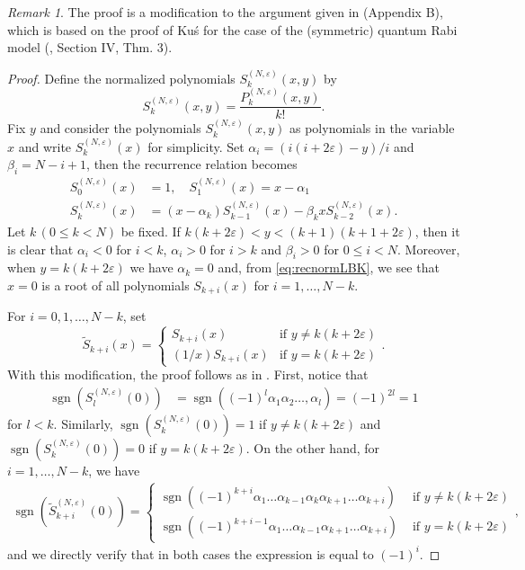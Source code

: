 \documentclass[11pt]{article}
\numberwithin{equation}{section}
\newcommand{\e}{\varepsilon}
\newcommand{\cp}[2]{P^{(#1)}_{#2}} %
\DeclareMathOperator{\sgn}{sgn}
\theoremstyle{plain}
\theoremstyle{definition}
\theoremstyle{remark}
\newtheorem{rem}{Remark}[section]
\begin{document}
\begin{rem}
  The proof is a modification to the argument given in \cite{LB2016JPA} (Appendix B), which is based on the proof of  Ku\'s for the case of
  the (symmetric) quantum Rabi model (\cite{K1985JMP}, Section IV, Thm. 3).
\end{rem}

\begin{proof}
  Define the normalized polynomials \(S_k^{(N,\e)}(x,y)\) by
  \[
    S_k^{(N,\e)}(x,y) = \frac{\cp{N,\e}{k}(x,y)}{k!}.
  \]
  Fix \(y\) and consider the polynomials \(S_k^{(N,\e)}(x,y)\) as polynomials in the variable \(x\) and write \(S_k^{(N,\e)}(x)\) for
  simplicity. Set \(\alpha_i = (i(i + 2\e) - y)/i\) and \(\beta_i = N-i+1\), then the recurrence relation becomes
  \begin{align}
    \label{eq:recnormLBK}
    S_0^{(N,\e)}(x) &= 1, \quad S_1^{(N,\e)}(x) = x - \alpha_1 \nonumber \\
    S_k^{(N,\e)}(x) &= (x - \alpha_k ) S_{k-1}^{(N,\e)}(x) - \beta_k x S_{k-2}^{(N,\e)}(x).
  \end{align}
  Let \(k \, (0\leq k < N)\) be fixed. If \(k(k+2\e) < y < (k+1)(k+1 +2\e)\), then it is clear that \(\alpha_i < 0\) for \(i < k \), \(\alpha_i > 0 \) for
  \(i >k \) and \( \beta_i >0  \) for \(0 \leq i < N\). Moreover, when \( y =  k(k+2\e)\) we have \(\alpha_k = 0\) and, from \eqref{eq:recnormLBK},
  we see that \(x = 0\) is a root of all polynomials \(S_{k+i}(x) \) for \(i=1,\ldots,N-k\).

  For \(i=0,1,\ldots,N-k\), set
  \[
    \tilde{S}_{k+i}(x) =
    \begin{cases}
      S_{k+i}(x) &\mbox{if } y \neq k(k+2\e)  \\
      (1/x)S_{k+i}(x) & \mbox{if } y = k(k+2\e)
    \end{cases}.
  \]
  With this modification, the proof follows as in \cite{K1985JMP}. First, notice that
  \begin{align*}
    \sgn(S_l^{(N,\e)}(0)) &= \sgn((-1)^l \alpha_1 \alpha_2 \ldots, \alpha_l) = (-1)^{2l} = 1
  \end{align*}
  for \(l < k\). Similarly, \(\sgn(S_k^{(N,\e)}(0)) = 1\) if \(y \not= k(k+2\e) \) and \(\sgn(S_k^{(N,\e)}(0)) = 0 \) if \(y = k(k + 2\e )\).
  On the other hand, for \(i=1,\ldots,N-k\), we have
  \begin{align*}
    \sgn(\tilde{S}_{k+i}^{(N,\e)}(0)) =
    \begin{cases}
      \sgn((-1)^{k+i} \alpha_1 \ldots \alpha_{k-1} \alpha_k \alpha_{k+1} \ldots \alpha_{k+i} ) &  \text{ if } y \not= k(k+2\e) \\
      \sgn((-1)^{k+i-1} \alpha_1 \ldots \alpha_{k-1} \alpha_{k+1} \ldots \alpha_{k+i} ) & \text{ if } y = k(k+2\e)
    \end{cases},
  \end{align*}
  and we directly verify that in both cases the expression is equal to \( (-1)^{i} \).
  

\end{proof}
\end{document}
